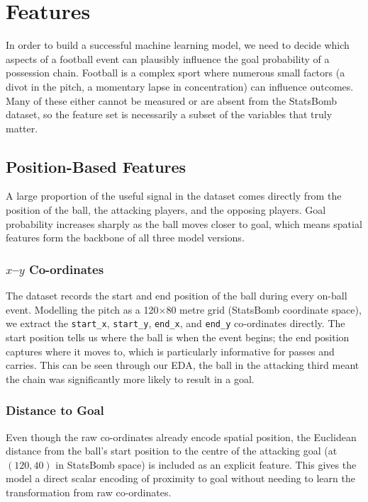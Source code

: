 \chapter{Features}\label{ch:features}

In order to build a successful machine learning model, we need to decide which aspects of a football event can plausibly influence the goal probability of a possession chain. Football is a complex sport where numerous small factors (a divot in the pitch, a momentary lapse in concentration) can influence outcomes. Many of these either cannot be measured or are absent from the StatsBomb dataset, so the feature set is necessarily a subset of the variables that truly matter.

\section{Position-Based Features}

A large proportion of the useful signal in the dataset comes directly from the position of the ball, the attacking players, and the opposing players. Goal probability increases sharply as the ball moves closer to goal, which means spatial features form the backbone of all three model versions.

\subsection{$x$--$y$ Co-ordinates}

The dataset records the start and end position of the ball during every on-ball event. Modelling the pitch as a 120$\times$80 metre grid (StatsBomb coordinate space), we extract the \texttt{start\_x}, \texttt{start\_y}, \texttt{end\_x}, and \texttt{end\_y} co-ordinates directly. The start position tells us where the ball is when the event begins; the end position captures where it moves to, which is particularly informative for passes and carries. This can be seen through our EDA, the ball in the attacking third meant the chain was significantly more likely to result in a goal.

\subsection{Distance to Goal}

Even though the raw co-ordinates already encode spatial position, the Euclidean distance from the ball's start position to the centre of the attacking goal (at $(120, 40)$ in StatsBomb space) is included as an explicit feature. This gives the model a direct scalar encoding of proximity to goal without needing to learn the transformation from raw co-ordinates.

